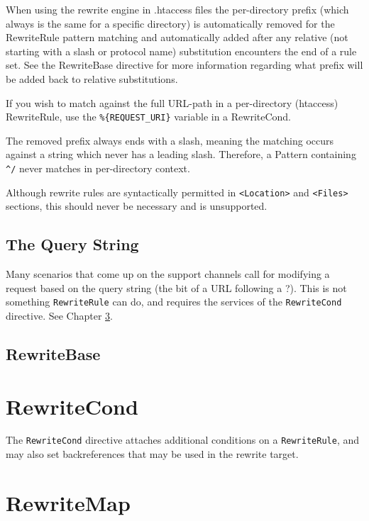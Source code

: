 When using the rewrite engine in .htaccess files the per-directory prefix (which always is the same for a specific directory) is automatically removed for the RewriteRule pattern matching and automatically added after any relative (not starting with a slash or protocol name) substitution encounters the end of a rule set. See the RewriteBase directive for more information regarding what prefix will be added back to relative substitutions.

If you wish to match against the full URL-path in a per-directory (htaccess) RewriteRule, use the \verb~%{REQUEST_URI}~ variable in a RewriteCond.

The removed prefix always ends with a slash, meaning the matching occurs against a string which never has a leading slash. Therefore, a Pattern containing \verb~^/~ never matches in per-directory context.

Although rewrite rules are syntactically permitted in \verb~<Location>~ and \verb~<Files>~ sections, this should never be necessary and is unsupported.

\section{The Query String}

Many scenarios that come up on the support channels call for modifying a request based on the query string (the bit of a URL following a ?). This is not something \verb~RewriteRule~ can do, and requires the services of the \verb~RewriteCond~ directive. See Chapter \ref{rewritecond}.

\section{RewriteBase}

\chapter{RewriteCond}
\label{rewritecond}

The \verb~RewriteCond~ directive attaches additional conditions on a \verb~RewriteRule~, and may also set backreferences that may be used in the rewrite target.



\chapter{RewriteMap}
\label{chapter_rewritemap}

